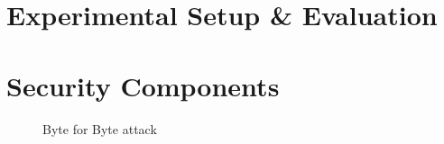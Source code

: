 \chapter{Experimental Setup \& Evaluation}
\label{chap:exp-setup-eavluation}




%  


\chapter{Security Components}
\label{chap:sec-components}


\begin{figure}[H]
	\centering
	
	\caption{Byte for Byte attack} \label{fig:byte-for-byte}
\end{figure}


